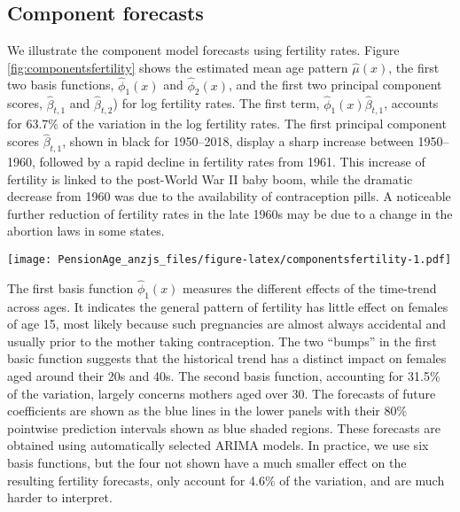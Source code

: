 \documentclass[
  doublespace]{anzsauth}
\let\origfigure\figure
\let\endorigfigure\endfigure
\renewenvironment{figure}[1][2] {
    \expandafter\origfigure\expandafter[tbp]
} {
    \endorigfigure
}
\begin{document}
\hypertarget{component-forecasts}{%
\subsection{Component forecasts}\label{component-forecasts}}

We illustrate the component model forecasts using fertility rates. Figure \ref{fig:componentsfertility} shows the estimated mean age pattern \(\widehat{\mu}(x)\), the first two basis functions, \(\widehat{\phi}_1(x)\) and \(\widehat{\phi}_2(x)\), and the first two principal component scores, \(\widehat{\beta}_{t,1}\) and \(\widehat{\beta}_{t,2}\)) for log fertility rates. The first term, \(\widehat{\phi}_1(x) \widehat{\beta}_{t,1}\), accounts for 63.7\% of the variation in the log fertility rates. The first principal component scores \(\widehat{\beta}_{t,1}\), shown in black for 1950--2018, display a sharp increase between 1950--1960, followed by a rapid decline in fertility rates from 1961. This increase of fertility is linked to the post-World War II baby boom, while the dramatic decrease from 1960 was due to the availability of contraception pills. A noticeable further reduction of fertility rates in the late 1960s may be due to a change in the abortion laws in some states.

\begin{figure}
\centering
\texttt{[image: PensionAge\_anzjs\_files/figure-latex/componentsfertility-1.pdf]}
\caption{\label{fig:componentsfertility}Fitted basis functions and coefficients for Australian age-specific fertility rates.}
\end{figure}

The first basis function \(\widehat{\phi}_1(x)\) measures the different effects of the time-trend across ages. It indicates the general pattern of fertility has little effect on females of age 15, most likely because such pregnancies are almost always accidental and usually prior to the mother taking contraception. The two ``bumps'' in the first basic function suggests that the historical trend has a distinct impact on females aged around their 20s and 40s. The second basis function, accounting for 31.5\% of the variation, largely concerns mothers aged over 30. The forecasts of future coefficients are shown as the blue lines in the lower panels with their 80\% pointwise prediction intervals shown as blue shaded regions. These forecasts are obtained using automatically selected ARIMA models. In practice, we use six basis functions, but the four not shown have a much smaller effect on the resulting fertility forecasts, only account for 4.6\% of the variation, and are much harder to interpret.
\end{document}
